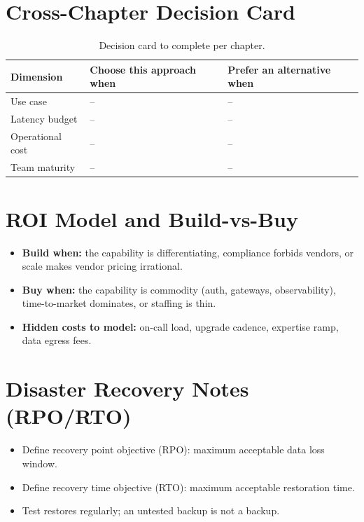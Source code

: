 \section{Cross-Chapter Decision Card}
\begin{table}[h]
  \centering
  \small
  \begin{tabularx}{\textwidth}{l X X}
    \toprule
    \textbf{Dimension} & \textbf{Choose this approach when} & \textbf{Prefer an alternative when} \\
    \midrule
    Use case & -- & -- \\
    Latency budget & -- & -- \\
    Operational cost & -- & -- \\
    Team maturity & -- & -- \\
    \bottomrule
  \end{tabularx}
  \caption{Decision card to complete per chapter.}
\end{table}

\section{ROI Model and Build-vs-Buy}
\begin{itemize}
  \item \textbf{Build when:} the capability is differentiating, compliance forbids vendors, or scale makes vendor pricing irrational.
  \item \textbf{Buy when:} the capability is commodity (auth, gateways, observability), time-to-market dominates, or staffing is thin.
  \item \textbf{Hidden costs to model:} on-call load, upgrade cadence, expertise ramp, data egress fees.
\end{itemize}

\section{Disaster Recovery Notes (RPO/RTO)}
\begin{itemize}
  \item Define recovery point objective (RPO): maximum acceptable data loss window.
  \item Define recovery time objective (RTO): maximum acceptable restoration time.
  \item Test restores regularly; an untested backup is not a backup.
\end{itemize}
